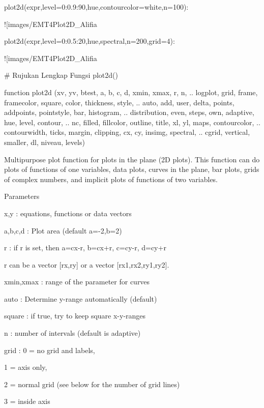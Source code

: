\documentclass{article}
\begin{document}
\>plot2d(expr,level=0:0.9:90,\>hue,contourcolor=white,n=100):


![images/EMT4Plot2D_Alifia%

\>plot2d(expr,level=0:0.5:20,\>hue,\>spectral,n=200,grid=4):


![images/EMT4Plot2D_Alifia%

# Rujukan Lengkap Fungsi plot2d()

  function plot2d (xv, yv, btest, a, b, c, d, xmin, xmax, r, n,  ..  
  logplot, grid, frame, framecolor, square, color, thickness, style, ..  
  auto, add, user, delta, points, addpoints, pointstyle, bar, histogram,  ..  
  distribution, even, steps, own, adaptive, hue, level, contour,  ..  
  nc, filled, fillcolor, outline, title, xl, yl, maps, contourcolor, ..  
  contourwidth, ticks, margin, clipping, cx, cy, insimg, spectral,  ..  
  cgrid, vertical, smaller, dl, niveau, levels)  

Multipurpose plot function for plots in the plane (2D plots). This function can do
plots of functions of one variables, data plots, curves in the plane, bar plots, grids
of complex numbers, and implicit plots of functions of two variables.


Parameters




x,y       : equations, functions or data vectors


a,b,c,d   : Plot area (default a=-2,b=2)


r         : if r is set, then a=cx-r, b=cx+r, c=cy-r, d=cy+r


            r can be a vector [rx,ry] or a vector [rx1,rx2,ry1,ry2].


xmin,xmax : range of the parameter for curves


auto      : Determine y-range automatically (default)


square    : if true, try to keep square x-y-ranges


n         : number of intervals (default is adaptive)


grid      : 0 = no grid and labels,


            1 = axis only,


            2 = normal grid (see below for the number of grid lines)


            3 = inside axis
\end{document}
